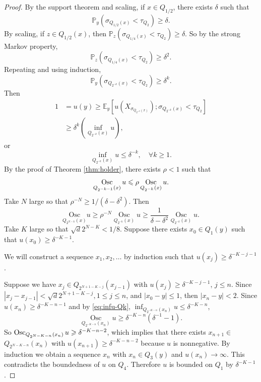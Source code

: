 \documentclass[twoside, 12pt]{book}
\numberwithin{equation}{chapter}
\def\geq{\geqslant}
\def\leq{\leqslant}
\def\osc{\mathop{{\rm Osc}}}
\begin{document}
\begin{proof}
        By the support theorem and scaling, if $x \in Q_{1/2}$, there exists $\delta$ such that 
        \[
            \mathbb{P}_y\left(\sigma_{Q_{1/2}(x)}<\tau_{Q_2}\right) \geq \delta .
        \]
        By scaling, if $z \in Q_{1/2}(x)$, then $\mathbb{P}_z\left(\sigma_{Q_{1/4}(x)}<\tau_{Q_2}\right) \geq \delta$. So by the strong Markov property,
        \[
            \mathbb{P}_z\left(\sigma_{Q_{1/4}(x)}<\tau_{Q_2}\right) \geq \delta^2 .
        \]
        Repeating and using induction,
        \[
            \mathbb{P}_y\left(\sigma_{Q_{2^{-k}}(x)}<\tau_{Q_2}\right) \geq \delta^k .
        \]
        Then
        \[
            \begin{aligned}
                1 & =u(y) \geq \mathbb{E}_y\left[u\left(X_{\sigma_{Q_{2^{-k}}(x)}}\right) ; \sigma_{Q_{2^{-k}}(x)}<\tau_{Q_2}\right] \\
                & \geq \delta^k\left(\inf _{Q_{2^{-k}}(x)} u\right),
            \end{aligned}
        \]
        or 
        \begin{equation}\label{eq:infu-Qk}
            \inf _{Q_{2^{-k}}(x)} u \leq \delta^{-k} , \quad \forall k\geq 1. 
        \end{equation}
        By the proof of Theorem \ref{thm:holder}, there exists $\rho<1$ such that
        \[
             \osc_{Q_{2^{-k-1}}(x)} u\leq \rho \osc_{Q_{2^{-k}}(x)}u .
        \]
        Take $N$ large so that $\rho^{-N} \geq 1/\left(\delta-\delta^2\right)$.  Then
        \[
            \underset{Q_{2^{N-k}}(x)}{\mathrm{Osc}} u \geq \rho^{-N} \underset{Q_{2^{-k}}(x)}{\operatorname{Osc}} u \geq \frac{1}{\delta-\delta^2} \underset{Q_{2^{-k}}(x)}{\operatorname{Osc}} u .
        \]
        Take $K$ large so that $\sqrt{d} 2^{N-K}<1 / 8$. Suppose there exists $x_0 \in Q_1(y)$ such that $u\left(x_0\right) \geq \delta^{-K-1}$. 
        \begin{framed}
            We will construct a sequence $x_1, x_2, \ldots$ by induction such that $u(x_j)\geq \delta^{-K-j-1}$. 
        \end{framed} Suppose we have $x_j \in Q_{2^{N+1-K-j}}\left(x_{j-1}\right)$ with $u\left(x_j\right) \geq \delta^{-K-j-1}$, $j \leq n$. Since $\left|x_j-x_{j-1}\right|<\sqrt{d} 2^{N+1-K-j}, 1 \leq j \leq n$, and $\left|x_0-y\right| \leq 1$, then $\left|x_n-y\right|<2$. Since $u\left(x_n\right) \geq \delta^{-K-n-1}$ and by  \eqref{eq:infu-Qk}, $\inf _{Q_{2^{-K-n}}(x_n)} u \leq \delta^{-K-n}$, 
        $$
            \underset{Q_{2^{-K-n}}(x_n)}{\operatorname{Osc}} u \geq \delta^{-K-n}\left(\delta^{-1}-1\right) .
        $$
        So $\osc_{Q_{2^{N-K-n}}(x_n)} u \geq \delta^{-K-n-2}$, which implies that there exists $x_{n+1} \in$ $Q_{ 2^{N-K-n}}(x_n)$ with $u\left(x_{n+1}\right) \geq \delta^{-K-n-2}$ because $u$ is nonnegative. By induction we obtain a sequence $x_n$ with $x_n \in Q_3(y)$ and $u\left(x_n\right) \rightarrow \infty$. This contradicts the boundedness of $u$ on $Q_4$. Therefore $u$ is bounded on $Q_1$ by $\delta^{-K-1}$.

    \end{proof}
	
\end{document}
